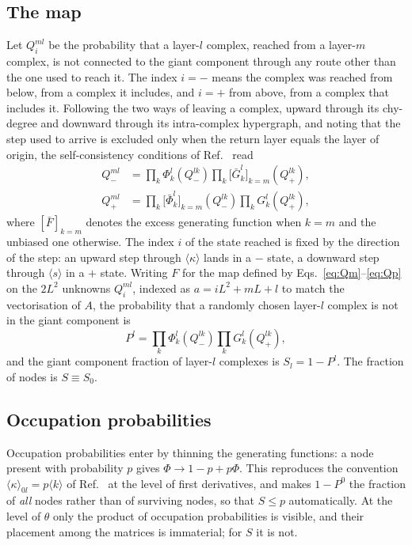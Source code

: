 \documentclass[aps,pre,twocolumn,superscriptaddress,floatfix,longbibliography]{revtex4-2}
\newcommand{\ave}[1]{\langle #1 \rangle}
\begin{document}
\subsection{The map}

Let $Q^{ml}_i$ be the probability that a layer-$l$ complex, reached from a
layer-$m$ complex, is not connected to the giant component through any route
other than the one used to reach it. The index $i=-$ means the complex was
reached from below, from a complex it includes, and $i=+$ from above, from a
complex that includes it. Following the two ways of leaving a complex, upward
through its chy-degree and downward through its intra-complex hypergraph, and
noting that the step used to arrive is excluded only when the return layer
equals the layer of origin, the self-consistency conditions of
Ref.~\cite{vazquez2023pre} read
\begin{align}
  Q^{ml}_- &= \prod_k \Phi^l_k\!\left(Q^{lk}_-\right)
              \prod_k \Big[\bar G^l_k\Big]_{k=m}\!\!\left(Q^{lk}_+\right),
  \label{eq:Qm}\\
  Q^{ml}_+ &= \prod_k \Big[\bar\Phi^l_k\Big]_{k=m}\!\!\left(Q^{lk}_-\right)
              \prod_k G^l_k\!\left(Q^{lk}_+\right),
  \label{eq:Qp}
\end{align}
where $[\bar F]_{k=m}$ denotes the excess generating function when $k=m$ and the
unbiased one otherwise. The index $i$ of the state reached is fixed by the
direction of the step: an upward step through $\ave{\kappa}$ lands in a
$-$ state, a downward step through $\ave{s}$ in a $+$ state. Writing $F$ for
the map defined by Eqs.~\eqref{eq:Qm}--\eqref{eq:Qp} on the $2L^2$ unknowns
$Q^{ml}_i$, indexed as $a=iL^2+mL+l$ to match the vectorisation of $A$, the
probability that a randomly chosen layer-$l$ complex is not in the giant
component is
\begin{equation}
  P^l = \prod_k \Phi^l_k\!\left(Q^{lk}_-\right)\prod_k G^l_k\!\left(Q^{lk}_+\right),
  \label{eq:P}
\end{equation}
and the giant component fraction of layer-$l$ complexes is $S_l=1-P^l$. The
fraction of nodes is $S\equiv S_0$.

\subsection{Occupation probabilities}

Occupation probabilities enter by thinning the generating functions: a node
present with probability $p$ gives $\Phi\to1-p+p\Phi$. This reproduces the
convention $\ave{\kappa}_{0l}=p\ave{k}$ of Ref.~\cite{vazquez2024comnet} at the
level of first derivatives, and makes $1-P^0$ the fraction of \emph{all} nodes
rather than of surviving nodes, so that $S\le p$ automatically. At the level of
$\theta$ only the product of occupation probabilities is visible, and their
placement among the matrices is immaterial; for $S$ it is not.
\end{document}
